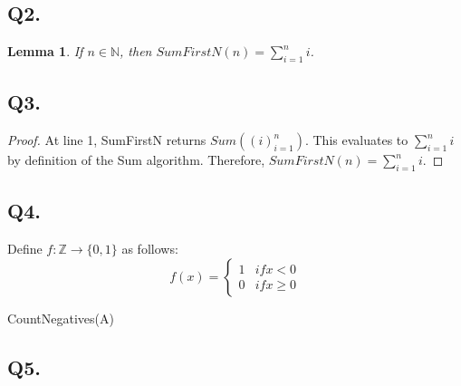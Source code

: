 \documentclass{article}
\newtheorem{lemma}{Lemma}
\theoremstyle{definition}
\begin{document}
\subsection{Q2.}
\begin{lemma}
    If $n \in \mathbb{N}$, then $SumFirstN(n) = \sum^n_{i=1} i$.
\end{lemma}

\subsection{Q3.}
\begin{proof}
    At line 1, SumFirstN returns $Sum((i)^n_{i=1})$. This evaluates to $\sum^n_{i=1} i$ by definition of the Sum algorithm. Therefore, $SumFirstN(n) = \sum^n_{i=1} i$.
\end{proof}

\subsection{Q4.}
Define $f: \mathbb{Z} \rightarrow \{0, 1\}$ as follows:
$$f(x) = \begin{cases}
    1 & if x < 0 \\
    0 & if x \geq 0
\end{cases}$$

\begin{algorithm}[H]


    \caption{CountNegatives(A)}
\end{algorithm} 

\subsection{Q5.}
\end{document}
